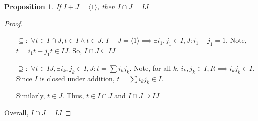 \documentclass{article}
\newtheorem*{prop}{Proposition}
\theoremstyle{definition}\newtheorem{definition}{Definition}
\begin{document}
	\begin{prop}
		If $I + J = \langle 1 \rangle$, then $I \cap J = I J$
	\end{prop}
	\begin{proof}\
		\begin{itemize}
			\item [$\subseteq:$] $\forall t \in I \cap J , t \in I \land t \in J$. $I + J = \langle 1 \rangle \implies \exists i_1 , j_1 \in I, J : i_1+j_1=1$. Note, $t=i_1t+j_1t \in IJ$. So, $I \cap J \subseteq I J$ 
			\item [$\supseteq:$] $\forall t \in I J, \exists i_k , j_k \in I, J : t= \sum {i_kj_k}$. Note, for all $k$, $i_k , j_k \in I, R \implies i_kj_k \in I $. Since $I$ is closed under addition, $t= \sum {i_kj_k} \in I $. 
			
			Similarly, $t \in J$. Thus, $t \in I \cap J$ and $I \cap J \supseteq I J$
		\end{itemize}
		Overall, $I \cap J = I J$
	\end{proof}		
\end{document}
